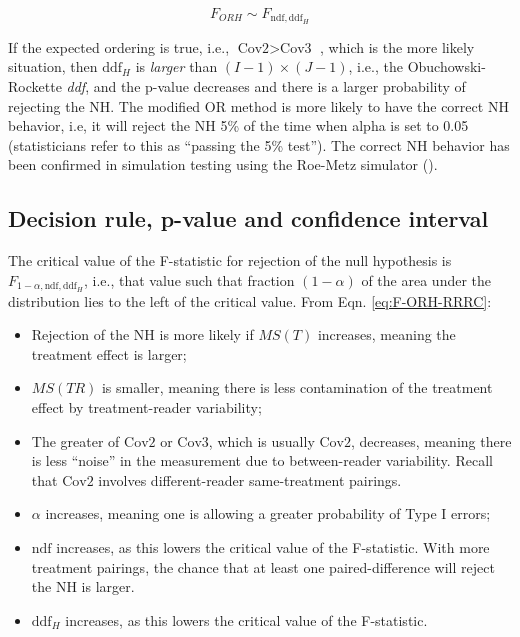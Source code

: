\documentclass[
]{book}
\begin{document}
\begin{equation}
F_{ORH}\sim F_{\text{ndf},\text{ddf}_H}
\label{eq:SamplingDistr-F-ORH-RRRC}
\end{equation}

If the expected ordering is true, i.e., \(\text{Cov2} > \text{Cov3}\) , which is the more likely situation, then \(\text{ddf}_H\) is \emph{larger} than \((I-1)\times(J-1)\), i.e., the Obuchowski-Rockette \emph{ddf}, and the p-value decreases and there is a larger probability of rejecting the NH. The modified OR method is more likely to have the correct NH behavior, i.e, it will reject the NH 5\% of the time when alpha is set to 0.05 (statisticians refer to this as ``passing the 5\% test''). The correct NH behavior has been confirmed in simulation testing using the Roe-Metz simulator (\citet{RN1866}).

\hypertarget{decision-rule-p-value-and-confidence-interval}{%
\subsection{Decision rule, p-value and confidence interval}\label{decision-rule-p-value-and-confidence-interval}}

The critical value of the F-statistic for rejection of the null hypothesis is \(F_{1-\alpha,\text{ndf},\text{ddf}_H}\), i.e., that value such that fraction \((1-\alpha)\) of the area under the distribution lies to the left of the critical value. From Eqn. \eqref{eq:F-ORH-RRRC}:

\begin{itemize}
\item
  Rejection of the NH is more likely if \(MS(T)\) increases, meaning the treatment effect is larger;
\item
  \(MS(TR)\) is smaller, meaning there is less contamination of the treatment effect by treatment-reader variability;
\item
  The greater of \(\text{Cov2}\) or \(\text{Cov3}\), which is usually \(\text{Cov2}\), decreases, meaning there is less ``noise'' in the measurement due to between-reader variability. Recall that \(\text{Cov2}\) involves different-reader same-treatment pairings.\\
\item
  \(\alpha\) increases, meaning one is allowing a greater probability of Type I errors;
\item
  \(\text{ndf}\) increases, as this lowers the critical value of the F-statistic. With more treatment pairings, the chance that at least one paired-difference will reject the NH is larger.
\item
  \(\text{ddf}_H\) increases, as this lowers the critical value of the F-statistic.
\end{itemize}
\end{document}
